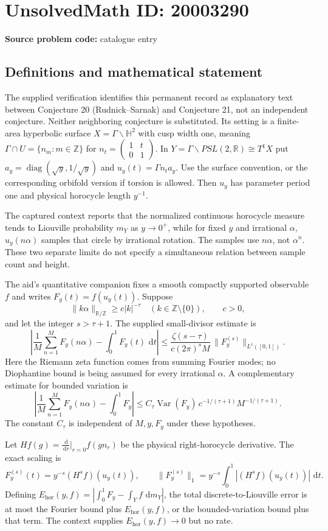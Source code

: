 \documentclass[11pt]{article}
\newcommand{\Z}{\mathbb{Z}}
\newcommand{\R}{\mathbb{R}}
\newcommand{\dd}{\,\mathrm{d}}
\begin{document}
\section*{UnsolvedMath ID: 20003290}
\textbf{Source problem code:} catalogue entry
\subsection{Definitions and mathematical statement}
The supplied verification identifies this permanent record as explanatory text between Conjecture 20 (Rudnick--Sarnak) and Conjecture 21, not an independent conjecture. Neither neighboring conjecture is substituted. Its setting is a finite-area hyperbolic surface $X=\Gamma\backslash\mathbb H^2$ with cusp width one, meaning $\Gamma\cap U=\{n_m:m\in\Z\}$ for $n_t=\begin{pmatrix}1&t\\0&1\end{pmatrix}$. In $Y=\Gamma\backslash PSL(2,\R)\cong T^1X$ put $a_y=\operatorname{diag}(\sqrt y,1/\sqrt y)$ and $u_y(t)=\Gamma n_ta_y$. Use the surface convention, or the corresponding orbifold version if torsion is allowed. Then $u_y$ has parameter period one and physical horocycle length $y^{-1}$.

The captured context reports that the normalized continuous horocycle measure tends to Liouville probability $m_Y$ as $y\to0^+$, while for fixed $y$ and irrational $\alpha$, $u_y(n\alpha)$ samples that circle by irrational rotation. The samples use $n\alpha$, not $\alpha^n$. These two separate limits do not specify a simultaneous relation between sample count and height.

The aid's quantitative companion fixes a smooth compactly supported observable $f$ and writes $F_y(t)=f(u_y(t))$. Suppose
\[
\|k\alpha\|_{\R/\Z}\geq c|k|^{-\tau}\quad(k\in\Z\setminus\{0\}),\qquad c>0,
\]
and let the integer $s>\tau+1$. The supplied small-divisor estimate is
\[
\left|\frac1M\sum_{n=1}^MF_y(n\alpha)-\int_0^1F_y(t)\,\dd t\right|
\leq\frac{\zeta(s-\tau)}{c(2\pi)^sM}\,\|F_y^{(s)}\|_{L^1([0,1])}.
\]
Here the Riemann zeta function comes from summing Fourier modes; no Diophantine bound is being assumed for every irrational $\alpha$. A complementary estimate for bounded variation is
\[
\left|\frac1M\sum_{n=1}^MF_y(n\alpha)-\int_0^1F_y\right|
\leq C_\tau\operatorname{Var}(F_y)\,c^{-1/(\tau+1)}M^{-1/(\tau+1)}.
\]
The constant $C_\tau$ is independent of $M,y,F_y$ under these hypotheses.

Let $Hf(g)=\frac{\dd}{\dd r}|_{r=0}f(gn_r)$ be the physical right-horocycle derivative. The exact scaling is
\[
F_y^{(s)}(t)=y^{-s}(H^sf)(u_y(t)),\qquad
\|F_y^{(s)}\|_1=y^{-s}\int_0^1|(H^sf)(u_y(t))|\,\dd t.
\]
Defining $E_{\mathrm{hor}}(y,f)=|\int_0^1F_y-\int_Yf\,\dd m_Y|$, the total discrete-to-Liouville error is at most the Fourier bound plus $E_{\mathrm{hor}}(y,f)$, or the bounded-variation bound plus that term. The context supplies $E_{\mathrm{hor}}(y,f)\to0$ but no rate.
\end{document}
